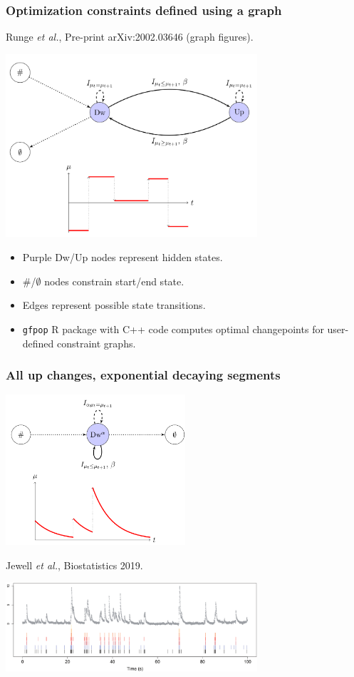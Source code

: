 \documentclass{beamer}
\begin{document}
\begin{frame}
  \frametitle{Optimization constraints defined using a graph}
  Runge \emph{et al.}, Pre-print arXiv:2002.03646 (graph figures).

  \includegraphics[width=0.7\textwidth]{gfpop-up-down}

  \begin{itemize}
  \item Purple Dw/Up nodes represent hidden states.
  \item \#/$\emptyset$ nodes constrain start/end state.
  \item Edges represent possible state transitions.
  \item \texttt{gfpop} R package with C++ code computes optimal
    changepoints for user-defined constraint graphs.
  \end{itemize}

\end{frame}



\begin{frame}
  \frametitle{All up changes, exponential decaying segments}
  \includegraphics[width=0.5\textwidth]{gfpop-decay}

  Jewell \emph{et al.}, Biostatistics 2019.

  \includegraphics[width=0.7\textwidth]{intro-neuroscience} 

\end{frame}
\end{document}
